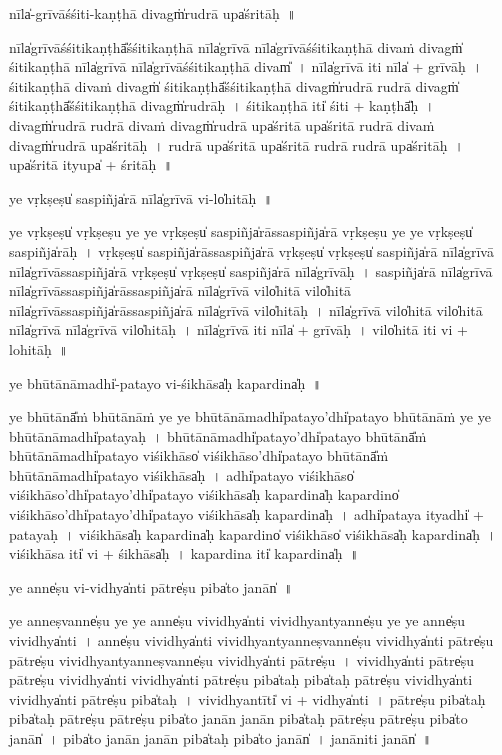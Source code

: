 \documentclass[parskip, DIV=14]{scrartcl}
\begin{document}
{nīla̍-grīvāśśiti॒-kaṇṭhā॒ divagṁ̍ru॒drā upa̍śritāḥ~॥

nīla̍grīvāśśiti॒kaṇṭhā̎śśiti॒kaṇṭhā॒ nīla̍grīvā॒ nīla̍grīvāśśiti॒kaṇṭhā॒ diva॒ṁ divagṁ̍ śiti॒kaṇṭhā॒ nīla̍grīvā॒ nīla̍grīvāśśiti॒kaṇṭhā॒ divam̎~।
nīla̍grīvā॒ iti॒ nīla̍ + grī॒vā॒ḥ॒~।
śi॒ti॒kaṇṭhā॒ diva॒ṁ divagṁ̍ śiti॒kaṇṭhā̎śśiti॒kaṇṭhā॒ divagṁ̍ru॒drā ru॒drā divagṁ̍ śiti॒kaṇṭhā̎śśiti॒kaṇṭhā॒ divagṁ̍ru॒drāḥ~।
śi॒ti॒kaṇṭhā॒ iti̍ śiti + kaṇṭhā̎ḥ~। %
divagṁ̍ru॒drā ru॒drā diva॒ṁ divagṁ̍ru॒drā upa̍śritā॒ upa̍śritā ru॒drā diva॒ṁ divagṁ̍ru॒drā upa̍śritāḥ~।
ru॒drā upa̍śritā॒ upa̍śritā ru॒drā ru॒drā upa̍śritāḥ~।
upa̍śritā॒ ityupa̍ + śri॒tā॒ḥ॒~॥


ye vṛ॒kṣeṣu̍ sa॒spiñja̍rā॒ nīla̍grīvā॒ vi-lo̍hitāḥ~॥

ye vṛ॒kṣeṣu̍ vṛ॒kṣeṣu॒ ye ye vṛ॒kṣeṣu̍ sa॒spiñja̍rāssa॒spiñja̍rā vṛ॒kṣeṣu॒ ye ye vṛ॒kṣeṣu̍ sa॒spiñja̍rāḥ~। %
vṛ॒kṣeṣu̍ sa॒spiñja̍rāssa॒spiñja̍rā vṛ॒kṣeṣu̍ vṛ॒kṣeṣu̍ sa॒spiñja̍rā॒ nīla̍grīvā॒ nīla̍grīvāssa॒spiñja̍rā vṛ॒kṣeṣu̍ vṛ॒kṣeṣu̍ sa॒spiñja̍rā॒ nīla̍grīvāḥ~।
sa॒spiñja̍rā॒ nīla̍grīvā॒ nīla̍grīvāssa॒spiñja̍rāssa॒spiñja̍rā॒ nīla̍grīvā॒ vilo̍hitā॒ vilo̍hitā॒ nīla̍grīvāssa॒spiñja̍rāssa॒spiñja̍rā॒ nīla̍grīvā॒ vilo̍hitāḥ~।
nīla̍grīvā॒ vilo̍hitā॒ vilo̍hitā॒ nīla̍grīvā॒ nīla̍grīvā॒ vilo̍hitāḥ~।
nīla̍grīvā॒ iti॒ nīla̍ + grī॒vā॒ḥ॒~।
vilo̍hitā॒ iti॒ vi + lo॒hi॒tā॒ḥ॒~॥

ye bhū॒tānā॒madhi̍-patayo vi-śi॒khāsa̍ḥ kapa॒rdina̍ḥ~॥

ye bhū॒tānā̎ṁ bhū॒tānā॒ṁ ye ye bhū॒tānā॒madhi̍pata॒yo'dhi̍patayo bhū॒tānā॒ṁ ye ye bhū॒tānā॒madhi̍patayaḥ~।
bhū॒tānā॒madhi̍pata॒yo'dhi̍patayo bhū॒tānā̎ṁ bhū॒tānā॒madhi̍patayo viśi॒khāso̍ viśi॒khāso'dhi̍patayo bhū॒tānā̎ṁ bhū॒tānā॒madhi̍patayo viśi॒khāsa̍ḥ~।
adhi̍patayo viśi॒khāso̍ viśi॒khāso'dhi̍pata॒yo'dhi̍patayo viśi॒khāsa̍ḥ kapa॒rdina̍ḥ kapa॒rdino̍ viśi॒khāso'dhi̍pata॒yo'dhi̍patayo viśi॒khāsa̍ḥ kapa॒rdina̍ḥ~। %
adhi̍pataya॒ ityadhi̍ + pa॒ta॒ya॒ḥ॒~।
vi॒śi॒khāsa̍ḥ kapa॒rdina̍ḥ kapa॒rdino̍ viśi॒khāso̍ viśi॒khāsa̍ḥ kapa॒rdina̍ḥ~।
vi॒śi॒khāsa॒ iti̍ vi + śi॒khāsa̍ḥ~।
ka॒pa॒rdina॒ iti̍ kapa॒rdina̍ḥ~॥

ye anne̍ṣu vi॒-vidhya̍nti॒ pātre̍ṣu॒ piba̍to॒ janān̍~॥

ye anne॒ṣvanne̍ṣu॒ ye ye anne̍ṣu vi॒vidhya̍nti vi॒vidhya॒ntyanne̍ṣu॒ ye ye anne̍ṣu vi॒vidhya̍nti~। %
anne̍ṣu vi॒vidhya̍nti vi॒vidhya॒ntyanne॒ṣvanne̍ṣu vi॒vidhya̍nti॒ pātre̍ṣu॒ pātre̍ṣu vi॒vidhya॒ntyanne॒ṣvanne̍ṣu vi॒vidhya̍nti॒ pātre̍ṣu~।
vi॒vidhya̍nti॒ pātre̍ṣu॒ pātre̍ṣu vi॒vidhya̍nti vi॒vidhya̍nti॒ pātre̍ṣu॒ piba̍ta॒ḥ piba̍ta॒ḥ pātre̍ṣu vi॒vidhya̍nti vi॒vidhya̍nti॒ pātre̍ṣu॒ piba̍taḥ~।
vi॒vidhya॒ntīti̍ vi + vidhya̍nti~। %
pātre̍ṣu॒ piba̍ta॒ḥ piba̍ta॒ḥ pātre̍ṣu॒ pātre̍ṣu॒ piba̍to॒ janā॒n janā॒n piba̍ta॒ḥ pātre̍ṣu॒ pātre̍ṣu॒ piba̍to॒ janān̍~।
piba̍to॒ janā॒n janā॒n piba̍ta॒ḥ piba̍to॒ janān̍~।
janā॒niti॒ janān̍~॥

}
\end{document}

